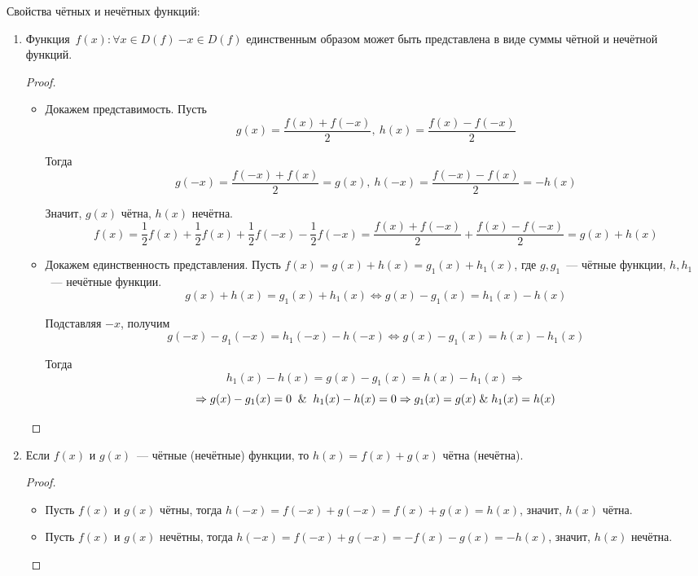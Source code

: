 Свойства чётных и нечётных функций:
\begin{enumerate}
	\item Функция~$f(x) \colon \forall x \in D(f) \ {-x} \in D(f)$ единственным образом может быть представлена в виде суммы чётной и нечётной функций.
	\begin{proof}
	\begin{itemize}
		\item Докажем представимость.
		Пусть
		\begin{equation*}
		g(x) = \frac{f(x) + f(-x)}2, \ h(x) = \frac{f(x) - f(-x)}2
		\end{equation*}
		
		Тогда
		\begin{equation*}
		g(-x) = \frac{f(-x) + f(x)}2 = g(x), \ h(-x) = \frac{f(-x) - f(x)}2 = -h(x)
		\end{equation*}
		
		Значит, $g(x)$ чётна, $h(x)$ нечётна.
		\begin{equation*}
		f(x) = \frac12 f(x) + \frac12 f(x) + \frac12 f(-x) - \frac12 f(-x) =
		\frac{f(x) + f(-x)}2 + \frac{f(x) - f(-x)}2 =
		g(x) + h(x)
		\end{equation*}
		
		\item Докажем единственность представления.
		Пусть $f(x) = g(x) + h(x) = g_1(x) + h_1(x)$, где $g, g_1$~--- чётные функции, $h, h_1$~--- нечётные функции.
		\begin{equation*}
		g(x) + h(x) = g_1(x) + h_1(x) \Leftrightarrow
		g(x) - g_1(x) = h_1(x) - h(x)
		\end{equation*}
		
		Подставляя $-x$, получим
		\begin{equation*}
		g(-x) - g_1(-x) = h_1(-x) - h(-x) \Leftrightarrow
		g(x) - g_1(x) = h(x) - h_1(x)
		\end{equation*}
		
		Тогда
		\begin{equation*}
		h_1(x) - h(x) = g(x) - g_1(x) = h(x) - h_1(x) \Rightarrow
		\end{equation*}
		\begin{equation*}
		\Rightarrow g(x) - g_1(x) = 0 \And h_1(x) - h(x) = 0 \Rightarrow
		g_1(x) = g(x) \lAnd h_1(x) = h(x)
		\end{equation*}
	\end{itemize}
	\end{proof}
	
	\item Если $f(x)$ и $g(x)$~--- чётные (нечётные) функции, то $h(x) = f(x) + g(x)$ чётна (нечётна).
	\begin{proof}
	\begin{itemize}
		\item Пусть $f(x)$ и $g(x)$ чётны, тогда $h(-x) = f(-x) + g(-x) = f(x) + g(x) = h(x)$, значит, $h(x)$ чётна.
		\item Пусть $f(x)$ и $g(x)$ нечётны, тогда $h(-x) = f(-x) + g(-x) = -f(x) - g(x) = -h(x)$, значит, $h(x)$ нечётна.
	\end{itemize}
	\end{proof}
	

\end{enumerate}
